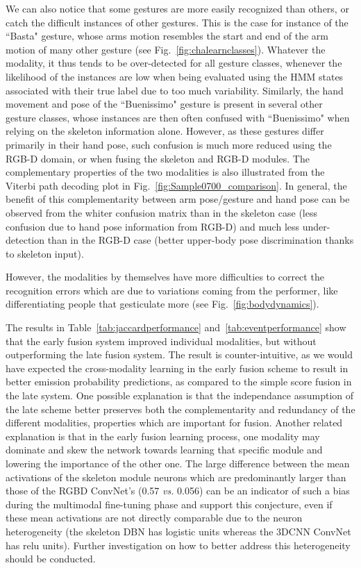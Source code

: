 We can also notice that some gestures are more easily recognized than others,
or catch the difficult instances of other gestures.
This is the case for instance of the ``Basta" gesture,
whose arms motion  resembles the  start and end of the arm motion of many other gesture (see Fig.~\ref{fig:chalearnclasses}).
Whatever the modality, it thus tends to be over-detected for all gesture classes, whenever the
likelihood of the instances are low when being evaluated using the HMM states associated with their true label
due to too much variability.
%
Similarly, the hand movement and pose of the ``Buenissimo" gesture is present in several other gesture classes,
whose instances are then often confused with ``Buenissimo" when relying on the skeleton information alone.
%
However, as these gestures differ primarily in their hand pose, such confusion is much more reduced using the RGB-D domain,
or when fusing  the skeleton and RGB-D modules.
%
The complementary properties of the two modalities is also illustrated from the Viterbi path decoding plot in Fig.~\ref{fig:Sample0700_comparison}.
In general, the benefit of this complementarity between arm pose/gesture and hand pose
can be observed from the whiter confusion matrix than in the skeleton case (less confusion due to hand pose information from RGB-D)
and much less under-detection than in the RGB-D case (better upper-body pose discrimination thanks to skeleton input).
%

However, the modalities by themselves have more difficulties to correct the recognition errors which are due to variations coming from the performer,
like differentiating  people that gesticulate more (see Fig.~\ref{fig:bodydynamics}).

%

The results in Table~\ref{tab:jaccardperformance} and~\ref{tab:eventperformance} show that the early fusion system
improved individual modalities, but without outperforming the late fusion system.
%
The result is counter-intuitive, as we would have expected the cross-modality learning in the early fusion scheme
to result in better emission probability predictions, as compared to the simple score fusion in the late system.
%
One possible explanation is that the independance assumption of the late scheme better preserves both
the complementarity and redundancy of the different modalities, properties which are important for fusion.
%
Another related explanation is that in the early fusion learning process,
one modality may dominate and  skew the network towards  learning that specific module and
lowering the importance of the other one.
%
The large difference between the mean activations of the  skeleton module neurons which are predominantly larger than those of the
RGBD ConvNet's (0.57 \emph{vs.} 0.056) can be an indicator of such a bias during the multimodal fine-tuning phase and
support this conjecture, even if these mean activations are not directly comparable
due to the neuron heterogeneity (the skeleton DBN has logistic units whereas the 3DCNN ConvNet has relu units).
%
Further investigation on how to better address this heterogeneity should be conducted.


